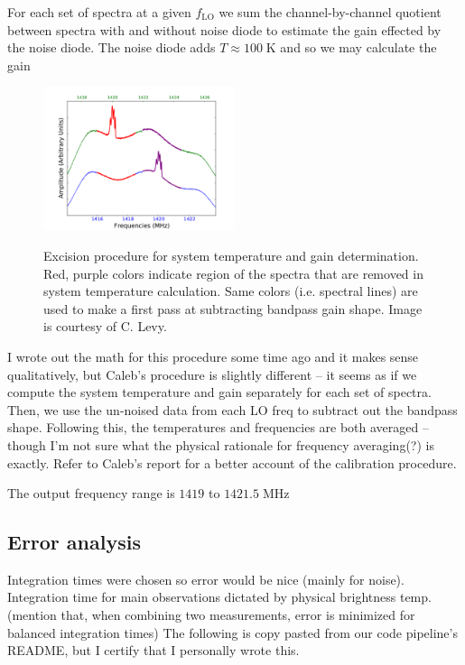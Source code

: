 \documentclass[10pt]{article}
\newcommand {\mt}{\mathrm}
\newcommand {\unit}[1]{\; \mt{#1}}
\begin{document}
For each set of spectra at a given $f_{\mt{LO}}$ we sum the channel-by-channel quotient between spectra with and without noise diode to estimate the gain effected by the noise diode.  The noise diode adds $T \approx 100\unit{K}$ and so we may calculate the gain 

\begin{figure}[!ht]
    \centering
    \includegraphics[width=0.5\textwidth]{Excized_Regions.pdf} \\
    \caption{Excision procedure for system temperature and gain determination.  Red, purple colors indicate region of the spectra that are removed in system temperature calculation.  Same colors (i.e. spectral lines) are used to make a first pass at subtracting bandpass gain shape.  Image is courtesy of C. Levy.}
    \label{fig:excized}
\end{figure}

I wrote out the math for this procedure some time ago and it makes sense qualitatively, but Caleb's procedure is slightly different -- it seems as if we compute the system temperature and gain separately for each set of spectra.  Then, we use the un-noised data from each LO freq to subtract out the bandpass shape.  Following this, the temperatures and frequencies are both averaged -- though I'm not sure what the physical rationale for frequency averaging(?) is exactly.  Refer to Caleb's report for a better account of the calibration procedure.

The output frequency range is $1419$ to $1421.5\unit{MHz}$

\subsection{Error analysis}

Integration times were chosen so error would be nice (mainly for noise).  Integration time for main observations dictated by physical brightness temp.  (mention that, when combining two measurements, error is minimized for balanced integration times)  The following is copy pasted from our code pipeline's README, but I certify that I personally wrote this.
\end{document}
